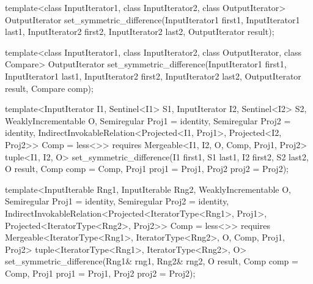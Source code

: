 %
\begin{removedblock}
\begin{itemdecl}
template<class InputIterator1, class InputIterator2,
         class OutputIterator>
  OutputIterator
    set_symmetric_difference(InputIterator1 first1, InputIterator1 last1,
                             InputIterator2 first2, InputIterator2 last2,
                             OutputIterator result);

template<class InputIterator1, class InputIterator2,
         class OutputIterator, class Compare>
  OutputIterator
    set_symmetric_difference(InputIterator1 first1, InputIterator1 last1,
                             InputIterator2 first2, InputIterator2 last2,
                             OutputIterator result, Compare comp);
\end{itemdecl}
\end{removedblock}
\begin{addedblock}
\begin{itemdecl}
template<InputIterator I1, Sentinel<I1> S1, InputIterator I2, Sentinel<I2> S2,
    WeaklyIncrementable O, Semiregular Proj1 = identity, Semiregular Proj2 = identity,
    IndirectInvokableRelation<Projected<I1, Proj1>, Projected<I2, Proj2>> Comp = less<>>
  requires Mergeable<I1, I2, O, Comp, Proj1, Proj2>
  tuple<I1, I2, O>
    set_symmetric_difference(I1 first1, S1 last1, I2 first2, S2 last2, O result,
                             Comp comp = Comp{}, Proj1 proj1 = Proj1{},
                             Proj2 proj2 = Proj2{});

template<InputIterable Rng1, InputIterable Rng2, WeaklyIncrementable O,
    Semiregular Proj1 = identity, Semiregular Proj2 = identity,
    IndirectInvokableRelation<Projected<IteratorType<Rng1>, Proj1>,
      Projected<IteratorType<Rng2>, Proj2>> Comp = less<>>
  requires Mergeable<IteratorType<Rng1>, IteratorType<Rng2>, O, Comp, Proj1, Proj2>
  tuple<IteratorType<Rng1>, IteratorType<Rng2>, O>
    set_symmetric_difference(Rng1& rng1, Rng2& rng2, O result, Comp comp = Comp{},
                             Proj1 proj1 = Proj1{}, Proj2 proj2 = Proj2{});
\end{itemdecl}
\end{addedblock}

